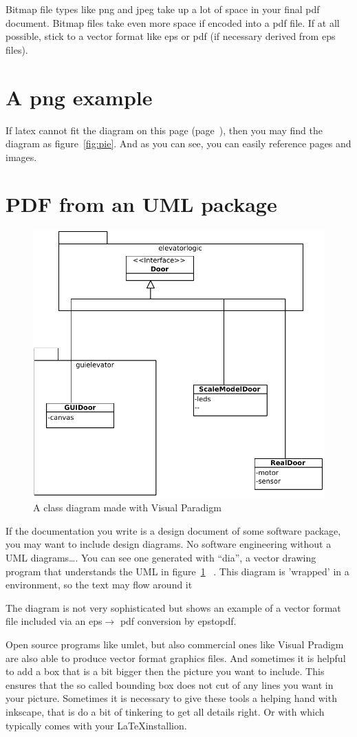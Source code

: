 Bitmap file types like png and jpeg take up a lot of space in your
final pdf document. 
Bitmap files take even more space if encoded into a pdf file.
If at all possible, stick to a vector format like eps or pdf (if
necessary derived from eps files). 


\section{A png example}
\label{page:pngexample}
If latex cannot fit the diagram on this page
(page~\pageref{page:pngexample}), 
 then you may find the diagram as figure~\vref{fig:pie}. And as you
 can see, you can easily reference pages and images.

\section{PDF from an UML package} 
\label{sec:pdffromuml}
\begin{figure}
  \includegraphics[width=.4\textwidth]{images/doorsystem.pdf}
  \caption{A class diagram made with Visual Paradigm}
  \label{fig:classdiagram}
\end{figure}
If the documentation you write is a design document of some software
package, you may want to include design diagrams.
No software engineering without a UML diagrams\ldots.
You can see one generated with ``dia'', a vector drawing program that
understands the UML in figure~\ref{fig:classdiagram}
~. This diagram is 'wrapped' in a  environment, so the text may flow around it

The diagram is not very sophisticated but shows an example of a vector
format file included via an eps$\rightarrow$ pdf conversion by
epstopdf.

Open source programs like umlet, but also commercial ones like Visual Pradigm are also able to produce
vector format graphics files. And sometimes it is helpful to add a box
that is a bit bigger then the picture you want to include.
This ensures that the so called bounding box does not cut of any lines
you want in your picture. Sometimes it is necessary to give these
tools a helping hand with inkscape, that is do a bit of tinkering to
get all details right. Or with  which typically comes with your \LaTeX installion.

